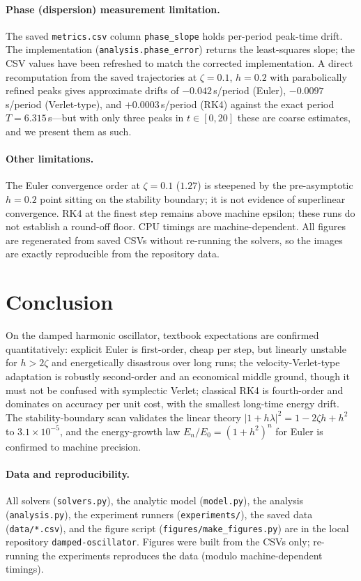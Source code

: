 \documentclass[11pt,a4paper]{article}
\begin{document}
\paragraph{Phase (dispersion) measurement limitation.}
The saved \texttt{metrics.csv} column \texttt{phase\_slope} holds
per-period peak-time drift. The implementation
(\texttt{analysis.phase\_error}) returns the least-squares slope;
the CSV values have been refreshed to match the corrected implementation.
A direct
recomputation from the saved trajectories at $\zeta=0.1$, $h=0.2$ with
parabolically refined peaks gives approximate drifts of
$-0.042$\,s/period (Euler), $-0.0097$\,s/period (Verlet-type), and
$+0.0003$\,s/period (RK4) against the exact period $T=6.315$\,s---but
with only three peaks in $t\in[0,20]$ these are coarse estimates, and we
present them as such.

\paragraph{Other limitations.}
The Euler convergence order at $\zeta=0.1$ ($1.27$) is steepened by the
pre-asymptotic $h=0.2$ point sitting on the stability boundary; it is
not evidence of superlinear convergence. RK4 at the finest step remains above machine epsilon; these runs do
not establish a round-off floor. CPU timings are machine-dependent. All figures are
regenerated from saved CSVs without re-running the solvers, so the
images are exactly reproducible from the repository data.

\section{Conclusion}
On the damped harmonic oscillator, textbook expectations are confirmed
quantitatively: explicit Euler is first-order, cheap per step, but
linearly unstable for $h>2\zeta$ and energetically disastrous over long
runs; the velocity-Verlet-type adaptation is robustly second-order and
an economical middle ground, though it must not be confused with
symplectic Verlet; classical RK4 is fourth-order and dominates on
accuracy per unit cost, with the smallest long-time energy drift. The
stability-boundary scan validates the linear theory
$|1+h\lambda|^2=1-2\zeta h+h^2$ to $3.1\times10^{-5}$, and the
energy-growth law $E_n/E_0=(1+h^2)^n$ for Euler is confirmed to machine
precision.

\paragraph{Data and reproducibility.}
All solvers (\texttt{solvers.py}), the analytic model
(\texttt{model.py}), the analysis (\texttt{analysis.py}), the experiment
runners (\texttt{experiments/}), the saved data (\texttt{data/*.csv}),
and the figure script (\texttt{figures/make\_figures.py}) are in the
local repository \texttt{damped-oscillator}. Figures were built
from the CSVs only; re-running the experiments reproduces the data
(modulo machine-dependent timings).
\end{document}
